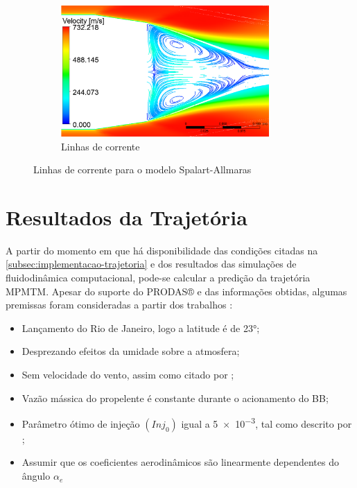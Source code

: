 \begin{figure}[!ht]
    \hfill
    \begin{subfigure}[b]{0.47\textwidth}
        \centering
        \includegraphics[height=5cm,width=\textwidth]{corrente-velocidade-SPALART-2pol.png}
        \caption{Linhas de corrente}
        \label{fig:corrente-velocidade-bb-2pol-RANS}
    \end{subfigure} 	
 	\caption{Linhas de corrente para o modelo Spalart-Allmaras}
    \label{fig:influencia-RANS-bb}
\end{figure}

\section{Resultados da Trajetória}\label{sec:resultados-trajetoria}

A partir do momento em que há disponibilidade das condições citadas na \autoref{subsec:implementacao-trajetoria} e dos resultados das simulações de fluidodinâmica computacional, pode-se calcular a predição da trajetória MPMTM. Apesar do suporte do PRODAS® e das informações obtidas, algumas premissas foram consideradas a partir dos trabalhos \cite{Rosendo2020,ThallyoENCIT2022,RosendoCILAMCE2022}:

\begin{itemize}
    \item Lançamento do Rio de Janeiro, logo a latitude é de \ang{23};
    \item Desprezando efeitos da umidade sobre a atmosfera;
    \item Sem velocidade do vento, assim como citado por \citeauthor{Rosendo2020};
    \item Vazão mássica do propelente é constante durante o acionamento do BB;
    \item Parâmetro ótimo de injeção \(\left(Inj_{0}\right)\) igual a \num{5e-3}, tal como descrito por \citeauthor{DAVENAS1993329};
    \item Assumir que os coeficientes aerodinâmicos são linearmente dependentes do ângulo \(\alpha_{e}\)
\end{itemize}

